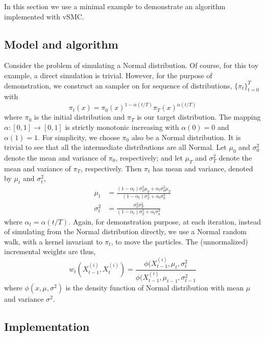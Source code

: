 In this section we use a minimal example to demonstrate an \smc algorithm
implemented with vSMC.

\subsection{Model and algorithm}
\label{sub:Model and algorithm}

Consider the problem of simulating a Normal distribution. Of course, for this
toy example, a direct simulation is trivial. However, for the purpose of
demonstration, we construct an \smc sampler on for sequence of distributions,
$\{\pi_t\}_{t=0}^T$ with
\begin{equation}
  \pi_t(x) = \pi_0(x)^{1 - \alpha(t/T)}\pi_T(x)^{\alpha(t/T)}
\end{equation}
where $\pi_0$ is the initial distribution and $\pi_T$ is our target
distribution. The mapping $\alpha:[0,1]\to[0,1]$ is strictly monotonic
increasing with $\alpha(0) = 0$ and $\alpha(1) = 1$. For simplicity, we choose
$\pi_0$ also be a Normal distribution. It is trivial to see that all the
intermediate distributions are all Normal. Let $\mu_0$ and $\sigma_0^2$ denote
the mean and variance of $\pi_0$, respectively; and let $\mu_T$ and
$\sigma_T^2$ denote the mean and variance of $\pi_T$, respectively. Then
$\pi_t$ has mean and variance, denoted by $\mu_t$ and $\sigma_t^2$,
\begin{align}
  \mu_t &= \frac{(1 - \alpha_t)\sigma_T^2\mu_0 + \alpha_t\sigma_0^2\mu_T}
  {(1 - \alpha_t)\sigma_T^2 + \alpha_t\sigma_0^2} \label{eq:mini mu_t}\\
  \sigma_t^2 &= \frac{\sigma_0^2\sigma_T^2}
  {(1 - \alpha_t)\sigma_T^2 + \alpha_t\sigma_0^2} \label{eq:mini var_t}
\end{align}
where $\alpha_t = \alpha(t/T)$. Again, for demonstration purpose, at each
iteration, instead of simulating from the Normal distribution directly, we use
a Normal random walk, with a kernel invariant to $\pi_t$, to move the
particles. The (unnormalized) incremental weights are thus,
\begin{equation}
  w_t(X_{t-1}^{(i)}, X_t^{(i)}) =
  \frac{\phi(X_{t-1}^{(i)},\mu_t,\sigma_t^2}
  {\phi(X_{t-1}^{(i)},\mu_{t-1},\sigma_{t-1}^2}
\end{equation}
where $\phi(x,\mu,\sigma^2)$ is the density function of Normal distribution
with mean $\mu$ and variance $\sigma^2$.

\subsection{Implementation}
\label{sub:Implementation}

